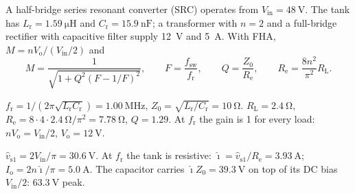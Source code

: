 


A half-bridge series resonant converter (SRC) operates from $V_\mathrm{in}=\SI{48}{\volt}$. The tank has $L_\mathrm{r}=\SI{1.59}{\micro\henry}$ and $C_\mathrm{r}=\SI{15.9}{\nano\farad}$; a transformer with $n=2$ and a full-bridge rectifier with capacitive filter supply \SI{12}{\volt} and \SI{5}{\ampere}. With FHA, $M=nV_\mathrm{o}/(V_\mathrm{in}/2)$ and
\begin{equation}
	M=\frac{1}{\sqrt{1+Q^2\left(F-1/F\right)^2}},\qquad F=\frac{f_\mathrm{sw}}{f_\mathrm{r}},\qquad Q=\frac{Z_0}{R_\mathrm{e}},\qquad R_\mathrm{e}=\frac{8n^2}{\pi^2}R_\mathrm{L}.
\end{equation}


\begin{solutionblock}
	$f_\mathrm{r}=1/(2\pi\sqrt{L_\mathrm{r}C_\mathrm{r}})=\SI{1.00}{\mega\hertz}$, $Z_0=\sqrt{L_\mathrm{r}/C_\mathrm{r}}=\SI{10}{\ohm}$. $R_\mathrm{L}=\SI{2.4}{\ohm}$, $R_\mathrm{e}=8\cdot4\cdot\SI{2.4}{\ohm}/\pi^2=\SI{7.78}{\ohm}$, $Q=1.29$. At $f_\mathrm{r}$ the gain is 1 for every load: $nV_\mathrm{o}=V_\mathrm{in}/2$, $V_\mathrm{o}=\SI{12}{\volt}$.
\end{solutionblock}


\begin{solutionblock}
	$\hat{v}_\mathrm{s1}=2V_\mathrm{in}/\pi=\SI{30.6}{\volt}$. At $f_\mathrm{r}$ the tank is resistive: $\hat{\imath}=\hat{v}_\mathrm{s1}/R_\mathrm{e}=\SI{3.93}{\ampere}$; $I_\mathrm{o}=2n\hat{\imath}/\pi=\SI{5.0}{\ampere}$. The capacitor carries $\hat{\imath}Z_0=\SI{39.3}{\volt}$ on top of its DC bias $V_\mathrm{in}/2$: $\SI{63.3}{\volt}$ peak.
\end{solutionblock}


